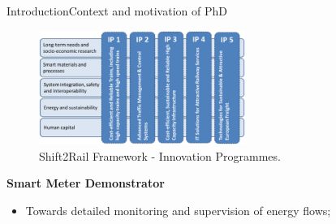 \begin{frame}{Introduction}{Context and motivation of PhD}
	\begin{figure}[ht!]
	\centering
	\includegraphics[width=0.6\textwidth,keepaspectratio]{figures/1.Intro/IPs}
	\caption{Shift2Rail Framework - Innovation Programmes. \cite{shift2rail2015}}
	\end{figure}
\pause
\vspace{-1em}
	\begin{block}{\textbf{Smart Meter Demonstrator}}
	\begin{itemize}
		\setlength\itemsep{0em}
		\item Towards detailed monitoring and supervision of energy flows;
	\end{itemize}
	\end{block}



\end{frame}



	
